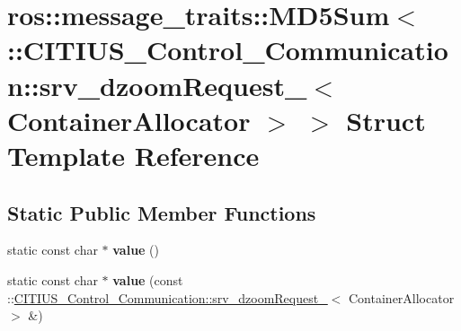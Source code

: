 \hypertarget{structros_1_1message__traits_1_1_m_d5_sum_3_01_1_1_c_i_t_i_u_s___control___communication_1_1srv_7e69024f396aeffd2b381e4eb10b8d77}{\section{ros\-:\-:message\-\_\-traits\-:\-:\-M\-D5\-Sum$<$ \-:\-:\-C\-I\-T\-I\-U\-S\-\_\-\-Control\-\_\-\-Communication\-:\-:srv\-\_\-dzoom\-Request\-\_\-$<$ \-Container\-Allocator $>$ $>$ \-Struct \-Template \-Reference}
\label{structros_1_1message__traits_1_1_m_d5_sum_3_01_1_1_c_i_t_i_u_s___control___communication_1_1srv_7e69024f396aeffd2b381e4eb10b8d77}
}
\subsection*{\-Static \-Public \-Member \-Functions}
\begin{DoxyCompactItemize}
\item 
\hypertarget{structros_1_1message__traits_1_1_m_d5_sum_3_01_1_1_c_i_t_i_u_s___control___communication_1_1srv_7e69024f396aeffd2b381e4eb10b8d77_a506a5d1c4caa7709906975a1e07bf1f9}{static const char $\ast$ {\bfseries value} ()}\label{structros_1_1message__traits_1_1_m_d5_sum_3_01_1_1_c_i_t_i_u_s___control___communication_1_1srv_7e69024f396aeffd2b381e4eb10b8d77_a506a5d1c4caa7709906975a1e07bf1f9}

\item 
\hypertarget{structros_1_1message__traits_1_1_m_d5_sum_3_01_1_1_c_i_t_i_u_s___control___communication_1_1srv_7e69024f396aeffd2b381e4eb10b8d77_a9e14137c350895f2fb6d3b3223d59d01}{static const char $\ast$ {\bfseries value} (const \-::\hyperlink{struct_c_i_t_i_u_s___control___communication_1_1srv__dzoom_request__}{\-C\-I\-T\-I\-U\-S\-\_\-\-Control\-\_\-\-Communication\-::srv\-\_\-dzoom\-Request\-\_\-}$<$ \-Container\-Allocator $>$ \&)}\label{structros_1_1message__traits_1_1_m_d5_sum_3_01_1_1_c_i_t_i_u_s___control___communication_1_1srv_7e69024f396aeffd2b381e4eb10b8d77_a9e14137c350895f2fb6d3b3223d59d01}

\end{DoxyCompactItemize}
